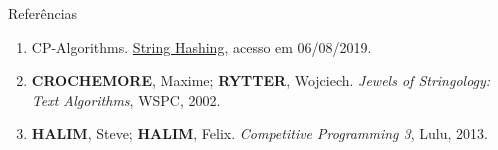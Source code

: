 \begin{frame}[fragile]{Referências}

    \begin{enumerate}
        \item CP-Algorithms. \href{https://cp-algorithms.com/string/string-hashing.html}{String Hashing}, acesso em 06/08/2019.

        \item \textbf{CROCHEMORE}, Maxime; \textbf{RYTTER}, Wojciech. \textit{Jewels of Stringology: Text Algorithms}, WSPC, 2002.

        \item \textbf{HALIM}, Steve; \textbf{HALIM}, Felix. \textit{Competitive Programming 3}, Lulu, 2013.
    \end{enumerate}

\end{frame}
